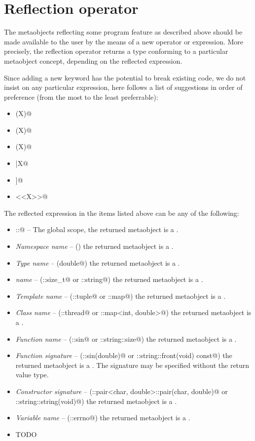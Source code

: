\section{Reflection operator}

The metaobjects reflecting some program feature \verb@X@ as
described above should be made available to the user by
the means of a new operator or expression.
More precisely, the reflection operator returns a type conforming to a particular
metaobject concept, depending on the reflected expression.

Since adding a new keyword has the potential to break existing code,
we do not insist on any particular expression, here follows a list of suggestions
in order of preference (from the most to the least preferrable):

\begin{itemize}
\item{\verb@mirrored(X)@}
\item{\verb@reflected(X)@}
\item{\verb@reflexpr(X)@}
\item{\verb@|X@}
\item{\verb@[[X]]@}
\item{\verb@<<X>>@}
\end{itemize}

The reflected expression \verb@X@ in the items listed above can be any of the following:

\begin{itemize}
\item{\verb@::@} -- The global scope, the returned metaobject is a {}.
\item{{\em Namespace name}} -- (\verb@std@) the returned metaobject is a {}.
\item{{\em Type name}} -- (\verb@long double@) the returned metaobject is a {}.
\item{{\em \verb@typedef@ name}} -- (\verb@std::size_t@ or \verb@std::string@)
     the returned metaobject is a {}.
\item{{\em Template name}} -- (\verb@std::tuple@ or \verb@std::map@)
     the returned metaobject is a {}.
\item{{\em Class name}} -- (\verb@std::thread@ or \verb@std::map<int, double>@)
     the returned metaobject is a {}.
\item{{\em Function name}} -- (\verb@std::sin@ or \verb@std::string::size@) the returned metaobject
     is a {}.
\item{{\em Function signature}} -- (\verb@std::sin(double)@ or \verb@std::string::front(void) const@)
     the returned metaobject is a {}. The signature may be specified without the
     return value type.
\item{{\em Constructor signature}} -- (\verb@std::pair<char, double>::pair(char, double)@
     or \verb@std::string::string(void)@) the returned metaobject is a {}.
\item{{\em Variable name}} -- (\verb@std::errno@) the returned metaobject is a {}.
\item{TODO}
\end{itemize}


